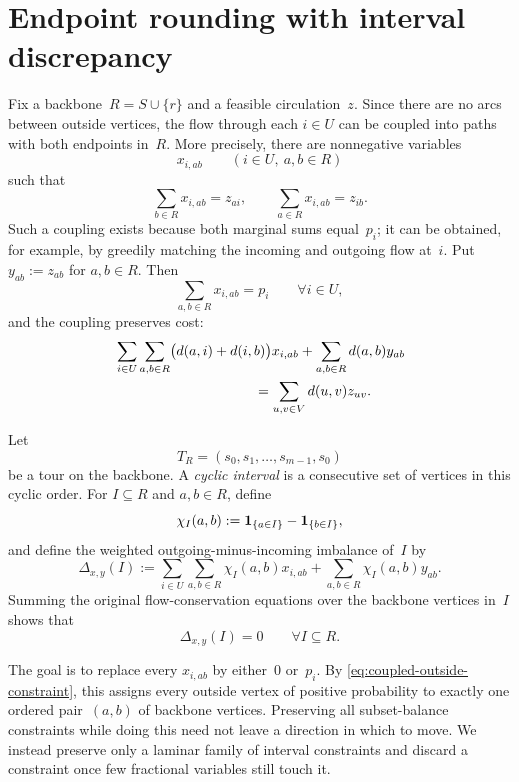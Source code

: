 \documentclass[12pt,a4paper,oneside]{report}
\begin{document}
\section{Endpoint rounding with interval discrepancy}
\label{sec:circulation-rounding}

Fix a backbone~$R=S\cup\{r\}$ and a feasible circulation~$z$.  Since there
are no arcs between outside vertices, the flow through each $i\in U$ can be
coupled into paths with both endpoints in~$R$.  More precisely, there are
nonnegative variables
\[
    x_{i,ab}
    \qquad(i\in U,\ a,b\in R)
\]
such that
\begin{equation}\label{eq:coupled-marginals}
    \sum_{b\in R}x_{i,ab}=z_{ai},
    \qquad
    \sum_{a\in R}x_{i,ab}=z_{ib}.
\end{equation}
Such a coupling exists because both marginal sums equal~$p_i$; it can be
obtained, for example, by greedily matching the incoming and outgoing flow
at~$i$.  Put $y_{ab}:=z_{ab}$ for $a,b\in R$.  Then
\begin{equation}\label{eq:coupled-outside-constraint}
    \sum_{a,b\in R}x_{i,ab}=p_i
    \qquad\forall i\in U,
\end{equation}
and the coupling preserves cost:
\begin{align}
    &\sum_{i\in U}\sum_{a,b\in R}
       \bigl(d(a,i)+d(i,b)\bigr)x_{i,ab}
      +\sum_{a,b\in R}d(a,b)y_{ab}
      \notag\\
    &\hspace{35mm}=
      \sum_{u,v\in V}d(u,v)z_{uv}.
    \label{eq:coupled-cost}
\end{align}

Let
\[
    T_R=(s_0,s_1,\ldots,s_{m-1},s_0)
\]
be a tour on the backbone.  A \emph{cyclic interval} is a consecutive set of
vertices in this cyclic order.  For $I\subseteq R$ and $a,b\in R$, define
\[
    \chi_I(a,b):=\mathbf{1}_{\{a\in I\}}-\mathbf{1}_{\{b\in I\}},
\]
and define the weighted outgoing-minus-incoming imbalance of~$I$ by
\begin{equation}\label{eq:interval-imbalance}
    \Delta_{x,y}(I)
    :=
    \sum_{i\in U}\sum_{a,b\in R}\chi_I(a,b)x_{i,ab}
    +\sum_{a,b\in R}\chi_I(a,b)y_{ab}.
\end{equation}
Summing the original flow-conservation equations over the backbone vertices
in~$I$ shows that
\[
    \Delta_{x,y}(I)=0
    \qquad\forall I\subseteq R.
\]

The goal is to replace every $x_{i,ab}$ by either~$0$ or~$p_i$.  By
\cref{eq:coupled-outside-constraint}, this assigns every outside vertex of
positive probability to exactly one ordered pair~$(a,b)$ of backbone
vertices.  Preserving all subset-balance constraints while doing this need not
leave a direction in which to move.  We instead preserve only a laminar
family of interval constraints and discard a constraint once few fractional
variables still touch it.
\end{document}
